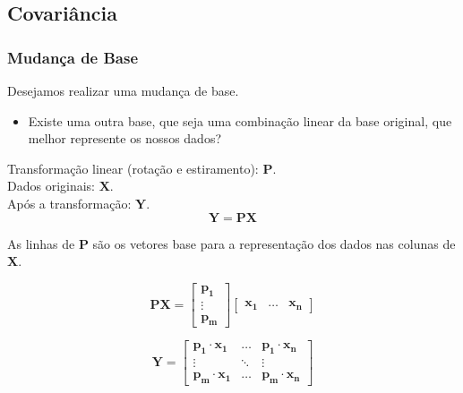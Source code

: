 \subsection{Covariância}
\begin{frame}[allowframebreaks]
  \frametitle{Mudança de Base}
  
  Desejamos realizar uma mudança de base.

  \begin{itemize}
  \item Existe uma outra base, que seja uma combinação linear da base original, que melhor represente os nossos dados?
  \end{itemize}   

  \vspace{0.5cm}
  Transformação linear (rotação e estiramento): $\mathbf{P}$. \\
  Dados originais: $\mathbf{X}$. \\
  Após a transformação: $\mathbf{Y}$. \\

  \begin{equation}
  \mathbf{Y} = \mathbf{P} \mathbf{X}
  \end{equation}

  \framebreak

  As linhas de $\mathbf{P}$ são os vetores base para a representação dos dados nas colunas de $\mathbf{X}$.

  \begin{equation}
  \mathbf{P} \mathbf{X} = \begin{bmatrix} \mathbf{p_1} \\ \vdots \\ \mathbf{p_m} \end{bmatrix} \begin{bmatrix} \mathbf{x_1} & \ldots & \mathbf{x_n} \end{bmatrix}
  \end{equation}

  \begin{equation}
  \mathbf{Y} = 
  \begin{bmatrix} 
  \mathbf{p_1} \cdot \mathbf{x_1} & \ldots & \mathbf{p_1} \cdot \mathbf{x_n} \\
  \vdots & \ddots & \vdots \\
  \mathbf{p_m} \cdot \mathbf{x_1} & \ldots & \mathbf{p_m} \cdot \mathbf{x_n}
  \end{bmatrix}
  \end{equation}


\end{frame}
